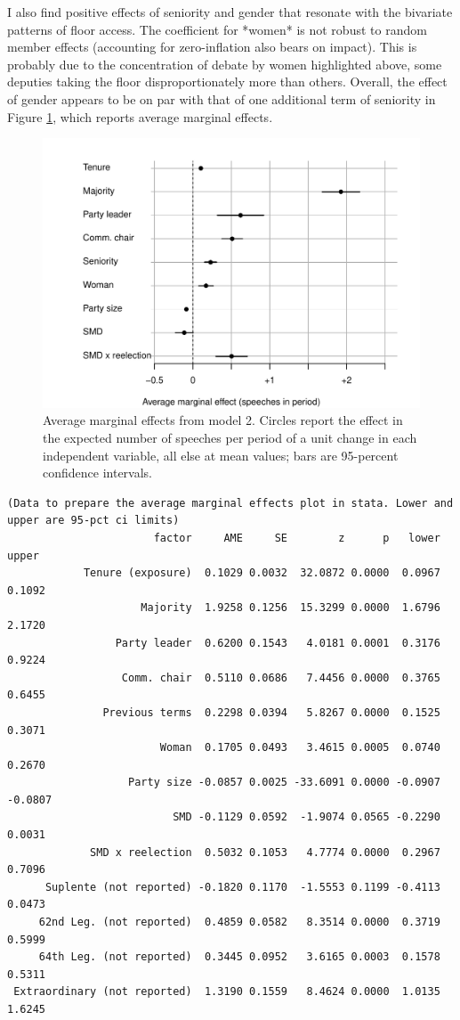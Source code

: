 \documentclass[letter,12pt]{article}
\begin{document}
I also find positive effects of seniority and gender that resonate with the bivariate patterns of floor access. The coefficient for *women* is not robust to random member effects (accounting for zero-inflation also bears on impact). This is probably due to the concentration of debate by women highlighted above, some deputies taking the floor disproportionately more than others. Overall, the effect of gender appears to be on par with that of one additional term of seniority in Figure \ref{F:avgmgeff}, which reports average marginal effects.

\begin{figure}
  \centering
    \includegraphics[width=.67\columnwidth]{../plots/avgMgEffects.pdf}
    \caption{Average marginal effects from model 2. Circles report the effect in the expected number of speeches per period of a unit change in each independent variable, all else at mean values; bars are 95-percent confidence intervals.}\label{F:avgmgeff}
\end{figure}

\singlespacing
\begin{scriptsize}
\begin{verbatim}
(Data to prepare the average marginal effects plot in stata. Lower and upper are 95-pct ci limits)
                       factor     AME     SE        z      p   lower   upper
            Tenure (exposure)  0.1029 0.0032  32.0872 0.0000  0.0967  0.1092
                     Majority  1.9258 0.1256  15.3299 0.0000  1.6796  2.1720
                 Party leader  0.6200 0.1543   4.0181 0.0001  0.3176  0.9224
                  Comm. chair  0.5110 0.0686   7.4456 0.0000  0.3765  0.6455
               Previous terms  0.2298 0.0394   5.8267 0.0000  0.1525  0.3071
                        Woman  0.1705 0.0493   3.4615 0.0005  0.0740  0.2670
                   Party size -0.0857 0.0025 -33.6091 0.0000 -0.0907 -0.0807
                          SMD -0.1129 0.0592  -1.9074 0.0565 -0.2290  0.0031
             SMD x reelection  0.5032 0.1053   4.7774 0.0000  0.2967  0.7096
      Suplente (not reported) -0.1820 0.1170  -1.5553 0.1199 -0.4113  0.0473
     62nd Leg. (not reported)  0.4859 0.0582   8.3514 0.0000  0.3719  0.5999
     64th Leg. (not reported)  0.3445 0.0952   3.6165 0.0003  0.1578  0.5311
 Extraordinary (not reported)  1.3190 0.1559   8.4624 0.0000  1.0135  1.6245
\end{verbatim}
\end{scriptsize}
\doublespacing
\end{document}
